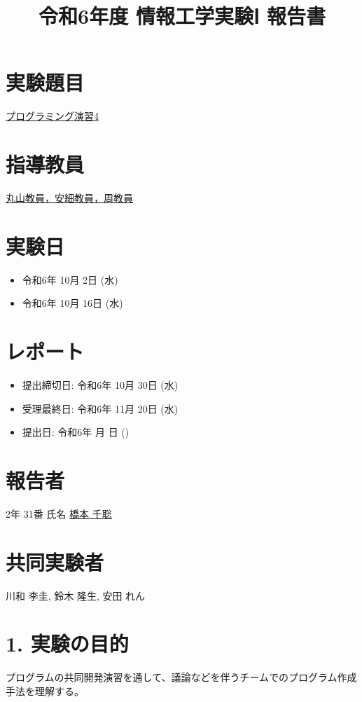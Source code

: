 \documentclass[a4paper,12pt]{article}
\title{令和6年度 情報工学実験Ⅰ 報告書}
\date{}
\begin{document}
\maketitle

\section*{実験題目}
\underline{プログラミング演習4}

\section*{指導教員}
\underline{丸山教員，安細教員，周教員}

\section*{実験日}
\begin{itemize}
    \item 令和6年 10月 2日 (水)
    \item 令和6年 10月 16日 (水)
\end{itemize}

\section*{レポート}
\begin{itemize}
    \item 提出締切日: 令和6年 10月 30日 (水)
    \item 受理最終日: 令和6年 11月 20日 (水)
    \item 提出日: 令和6年 \underline{\hspace{1cm}} 月 \underline{\hspace{1cm}} 日 (\underline{\hspace{1cm}})
\end{itemize}

\section*{報告者}
2年 31番 氏名 \underline{橋本 千聡}

\section*{共同実験者}
川和 李圭, 鈴木 隆生, 安田 れん

\newpage

\section*{1. 実験の目的}
プログラムの共同開発演習を通して、議論などを伴うチームでのプログラム作成手法を理解する。
\end{document}
